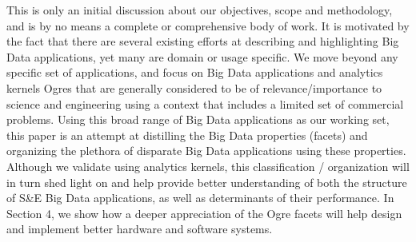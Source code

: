 \documentclass{acm_proc_article-sp}
\begin{document}
This is only an initial discussion about our objectives, scope and
methodology, and is by no means a complete or comprehensive body of
work. It is motivated by the fact that there are several existing
efforts at describing and highlighting Big Data applications, yet many
are domain or usage specific. We move beyond any specific set of
applications, and focus on Big Data applications and analytics kernels
Ogres that are generally considered to be of relevance/importance to
science and engineering using a context that includes a limited set of
commercial problems. Using this broad range of Big Data applications
as our working set, this paper is an attempt at distilling the Big
Data properties (facets) and organizing the plethora of disparate Big
Data applications using these properties. Although we validate using
analytics kernels, this classification / organization will in turn
shed light on and help provide better understanding of both the
structure of S\&E Big Data applications, as well as determinants of
their performance. In Section 4, we show how a deeper appreciation of
the Ogre facets will help design and implement better hardware and
software systems.








%

%
%
%

\end{document}
